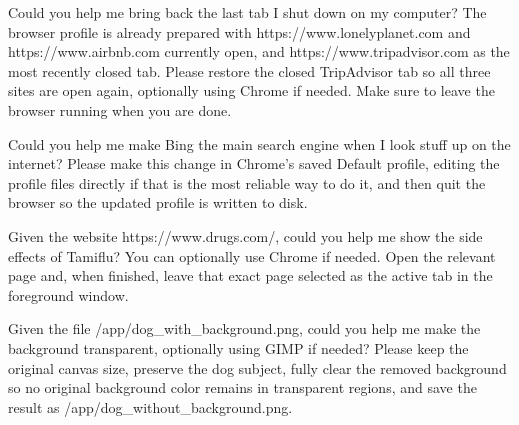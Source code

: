 \begin{instructionbox}
Could you help me bring back the last tab I shut down on my computer? The browser profile is already prepared with \textasciigrave{}https://www.lonelyplanet.com\textasciigrave{} and \textasciigrave{}https://www.airbnb.com\textasciigrave{} currently open, and \textasciigrave{}https://www.tripadvisor.com\textasciigrave{} as the most recently closed tab. Please restore the closed TripAdvisor tab so all three sites are open again, optionally using Chrome if needed. Make sure to leave the browser running when you are done.
\end{instructionbox}

\begin{instructionbox}
Could you help me make Bing the main search engine when I look stuff up on the internet? Please make this change in Chrome's saved Default profile, editing the profile files directly if that is the most reliable way to do it, and then quit the browser so the updated profile is written to disk.
\end{instructionbox}

\begin{instructionbox}
Given the website \textasciigrave{}https://www.drugs.com/\textasciigrave{}, could you help me show the side effects of Tamiflu? You can optionally use Chrome if needed. Open the relevant page and, when finished, leave that exact page selected as the active tab in the foreground window.
\end{instructionbox}

\begin{instructionbox}
Given the file \textasciigrave{}/app/dog\_with\_background.png\textasciigrave{}, could you help me make the background transparent, optionally using GIMP if needed? Please keep the original canvas size, preserve the dog subject, fully clear the removed background so no original background color remains in transparent regions, and save the result as \textasciigrave{}/app/dog\_without\_background.png\textasciigrave{}.
\end{instructionbox}

